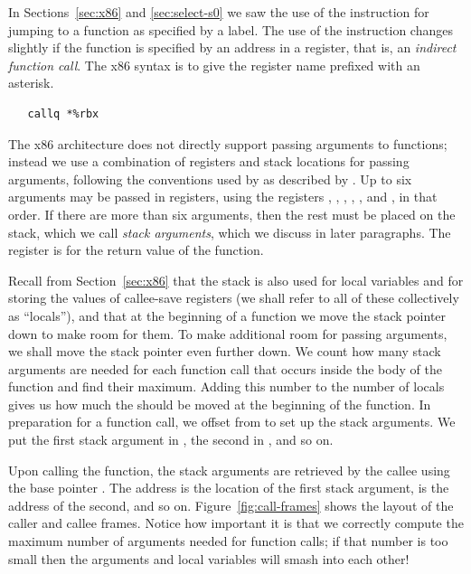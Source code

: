 \documentclass[11pt]{book}
\begin{document}
In Sections~\ref{sec:x86} and \ref{sec:select-s0} we saw the use of
the  instruction for jumping to a function as specified by
a label. The use of the instruction changes slightly if the function
is specified by an address in a register, that is, an \emph{indirect
  function call}. The x86 syntax is to give the register name prefixed
with an asterisk.
\begin{lstlisting}
   callq *%rbx
\end{lstlisting}

The x86 architecture does not directly support passing arguments to
functions; instead we use a combination of registers and stack
locations for passing arguments, following the conventions used by
 as described by \cite{Matz:2013aa}. Up to six arguments may
be passed in registers, using the registers , ,
, , , and , in that order.  If
there are more than six arguments, then the rest must be placed on the
stack, which we call \emph{stack arguments}, which we discuss in later
paragraphs. The register  is for the return value of the
function.

Recall from Section~\ref{sec:x86} that the stack is also used for
local variables and for storing the values of callee-save registers
(we shall refer to all of these collectively as ``locals''), and that
at the beginning of a function we move the stack pointer 
down to make room for them.
To make additional room for passing arguments, we shall
move the stack pointer even further down. We count how many stack
arguments are needed for each function call that occurs inside the
body of the function and find their maximum. Adding this number to the
number of locals gives us how much the  should be moved at
the beginning of the function. In preparation for a function call, we
offset from  to set up the stack arguments. We put the first
stack argument in , the second in , and
so on.

Upon calling the function, the stack arguments are retrieved by the
callee using the base pointer . The address 
is the location of the first stack argument,  is the
address of the second, and so on. Figure~\ref{fig:call-frames} shows
the layout of the caller and callee frames. Notice how important it is
that we correctly compute the maximum number of arguments needed for
function calls; if that number is too small then the arguments and
local variables will smash into each other!
\end{document}
